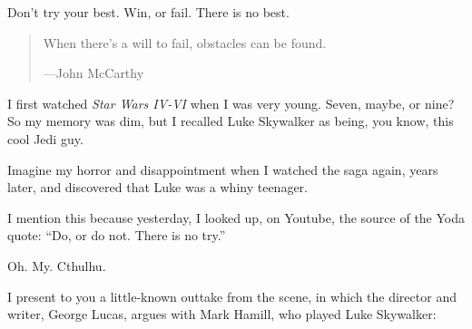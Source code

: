 {
 Don't try your best. Win, or fail. There is no
best.}

\myendsectiontext


\bigskip


\begin{quote}
{
 When there's a will to fail, obstacles can be
found.}

{\raggedleft
 {}---John McCarthy
\par}
\end{quote}


{
 I first watched \textit{Star Wars IV-VI} when I was very young.
Seven, maybe, or nine? So my memory was dim, but I recalled Luke
Skywalker as being, you know, this cool Jedi guy.}

{
 Imagine my horror and disappointment when I watched the saga
again, years later, and discovered that Luke was a whiny teenager.}

{
 I mention this because yesterday, I looked up, on Youtube, the
source of the Yoda quote: ``Do, or do not. There is no
try.''}

{
 Oh. My. Cthulhu.}

{
 I present to you a little-known outtake from the scene, in which
the director and writer, George Lucas, argues with Mark Hamill, who
played Luke Skywalker:}


